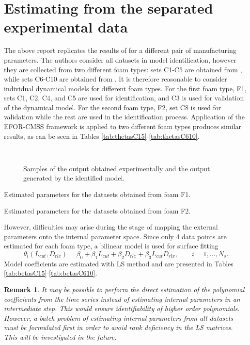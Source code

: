 \documentclass[a4paper,11pt,twoside]{article}
\theoremstyle{mytheoremstyle}
\newtheorem{remark}{Remark}[section]
\begin{document}
\section{Estimating from the separated experimental data}
\par The above report replicates the results of \cite{Wei2008} for a different pair of manufacturing parameters. The authors consider all datasets in model identification, however they are collected from two different foam types: sets C1-C5 are obtained from , while sets C6-C10 are obtained from . It is therefore reasonable to consider individual dynamical models for different foam types. For the first foam type, F1, sets C1, C2, C4, and C5 are used for identification, and C3 is used for validation of the dynamical model. For the second foam type, F2, set C8 is used for validation while the rest are used in the identification process. Application of the EFOR-CMSS framework is applied to two different foam types produces similar results, as can be seen in Tables \ref{tab:thetasC15}-\ref{tab:thetasC610}.
\begin{figure}[!t]
	\centering
	\subfloat[C3]{\label{fig:c3all}}\\
	\subfloat[C8]{\label{fig:c8all}}
	\caption{Samples of the output obtained experimentally and the output generated by the identified model.}\label{fig:Callout}
\end{figure}
\begin{table}[!h]
	\centering
	\caption{Estimated parameters for the datasets obtained from foam F1.}\label{tab:thetasC15}
	\small
	
\end{table}
\begin{table}[!h]
	\centering
	\caption{Estimated parameters for the datasets obtained from foam F2.}\label{tab:thetasC610}
	\small
	
\end{table}
However, difficulties may arise during the stage of mapping the external parameters onto the internal parameter space. Since only 4 data points are estimated for each foam type, a bilinear model is used for surface fitting
\begin{equation}
\theta_i(L_{cut},D_{rlx}) = \beta_0 + \beta_1 L_{cut} + \beta_2 D_{rlx} + \beta_3 L_{cut} D_{rlx}, \qquad i=1,\dots,N_s.
\end{equation}
Model coefficients are estimated with LS method and are presented in Tables \ref{tab:betasC15}-\ref{tab:betasC610}.
\begin{remark}
	It may be possible to perform the direct estimation of the polynomial coefficients from the time series instead of estimating internal parameters in an intermediate step. This would ensure identifiability of higher order polynomials. However, a batch problem of estimating internal parameters from all datasets must be formulated first in order to avoid rank deficiency in the LS matrices. This will be investigated in the future.
\end{remark}
\end{document}
